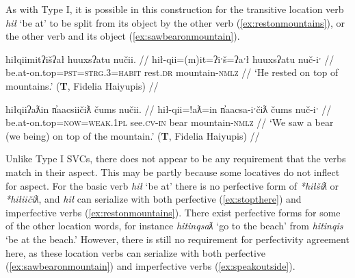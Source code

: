 As with Type I, it is possible in this construction for the transitive location verb \textit{hił} `be at' to be split from its object by the other verb (\ref{ex:restonmountains}), or the other verb and its object (\ref{ex:sawbearonmountain}).

\ex \label{ex:restonmountains}
\begingl
\glpreamble hiłqiimitʔišʔał huuxsʔatu nučii. //
\gla hił-qii=(m)it=ʔiˑš=ʔaˑł huuxsʔatu nuč-iˑ //
\glb be.at-on.top=\textsc{pst}=\textsc{strg.3}=\textsc{habit} rest.\textsc{dr} mountain-\textsc{nmlz} //
\glft `He rested on top of mountains.' (\textbf{T}, Fidelia Haiyupis) //
\endgl
\xe

\ex \label{ex:sawbearonmountain}
\begingl
\glpreamble hiłqiiʔaƛin n̓aacsiičiƛ čums nučii. //
\gla hił-qii=!aƛ=in n̓aacsa-iˑčiƛ čums nuč-iˑ //
\glb be.at-on.top=\textsc{now}=\textsc{weak.1pl} see.\textsc{cv}-\textsc{in} bear mountain-\textsc{nmlz} //
\glft `We saw a bear (we being) on top of the mountain.' (\textbf{T}, Fidelia Haiyupis) //
\endgl
\xe

\begin{comment}
\ex~ \label{ex:hiddeninthewall}
\begingl
\glpreamble huptsaapckʷaƛ hinałc̓ił ʔiiḥmisukʔi p̓atquk. //
\gla hupt-saˑp=ckʷiˑ=!aƛ hina-ałc̓ił ʔiiḥmis=uk=ʔiˑ p̓atquk //
\glb hide-\textsc{mo.caus}=remains.of=\textsc{now} \textsc{empty}-in.wall important=\textsc{poss}=\textsc{art} belongings //
\glft `They hid their belongings in the walls.' (\textbf{B}, Bob Mundy) //
\endgl
\xe
\end{comment}

\begin{comment}
This ``interruption" can occur the other way around, when the location word is intransitive.

\ex \label{ex:gasolinebydoor}
\begingl
\glpreamble ḥuqšiƛ ʔucačiƛ ḥaa yaqʔiitq hiiłsʔat̓uus gasoline.\footnotemark //
\gla ḥuq-šiƛ ʔu-ca-čiƛ ḥaa yaq=ʔiˑtq hił-L.sʔat̓uus gasoline //
\glb tip.over-\textsc{mo} \textsc{x}-go-\textsc{mo} who.what=\textsc{defn.3} be.at-by.the.door gasoline //
\glft `It knocked the gasoline over toward the door..' (\textbf{C}, \textit{tupaat} Julia Lucas) //
\endgl
\xe

\footnotetext{In this dependent construction, `gasoline' is the participant of the predicative relativizer \textit{yaq} `who'. The bracketing is [ḥuqšiƛ ʔucačiƛ]\textsubscript{pred} [ḥaa [yaqʔiitq hiiłsʔat̓uus gasoline] ]\textsubscript{part}}
\end{comment}

Unlike Type I SVCs, there does not appear to be any requirement that the verbs match in their aspect. This may be partly because some locatives do not inflect for aspect. For the basic verb \textit{hił} `be at' there is no perfective form of \textit{*hiłšiƛ} or \textit{*hiłiičiƛ}, and \textit{hił} can serialize with both perfective (\ref{ex:stopthere}) and imperfective verbs (\ref{ex:restonmountains}). There exist perfective forms for some of the other location words, for instance \textit{hitinqsaƛ} `go to the beach' from \textit{hitinqis} `be at the beach.' However, there is still no requirement for perfectivity agreement here, as these location verbs can serialize with both perfective (\ref{ex:sawbearonmountain}) and imperfective verbs (\ref{ex:speakoutside}).

